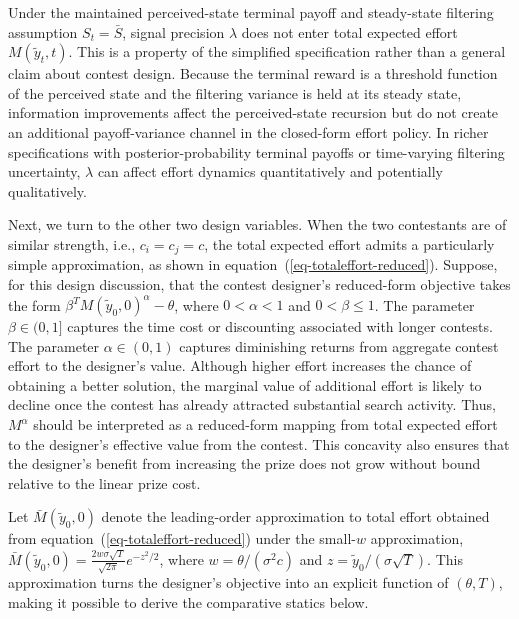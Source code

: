 \documentclass[mnsc]{informs3}
\begin{document}
Under the maintained perceived-state terminal payoff and steady-state filtering assumption $S_t=\bar S$, signal precision $\lambda$ does not enter total expected effort $M(\tilde{y}_t,t)$.
This is a property of the simplified specification rather than a general claim about contest design.
Because the terminal reward is a threshold function of the perceived state and the filtering variance is held at its steady state, information improvements affect the perceived-state recursion but do not create an additional payoff-variance channel in the closed-form effort policy.
In richer specifications with posterior-probability terminal payoffs or time-varying filtering uncertainty, $\lambda$ can affect effort dynamics quantitatively and potentially qualitatively.

Next, we turn to the other two design variables.
When the two contestants are of similar strength, i.e., $c_i = c_j = c$, the total expected effort admits a particularly simple approximation, as shown in equation~(\ref{eq-totaleffort-reduced}).
Suppose, for this design discussion, that the contest designer's reduced-form objective takes the form $\beta^{T}M(\tilde{y}_0,0)^\alpha-\theta$, where $0<\alpha<1$ and $0<\beta\leq 1$.
The parameter $\beta\in(0,1]$ captures the time cost or discounting associated
with longer contests.
The parameter $\alpha\in(0,1)$ captures diminishing returns from aggregate
contest effort to the designer's value.
Although higher effort increases the chance of obtaining a better solution, the marginal value of additional effort is likely to decline once the contest has already attracted substantial search
activity.
Thus, $M^\alpha$ should be interpreted as a reduced-form mapping from total expected effort to the designer's effective value from the contest.
This concavity also ensures that the designer's benefit from increasing the prize does not grow without bound relative to the linear prize cost.


Let $\bar{M}(\tilde y_0,0)$ denote the leading-order approximation to total effort obtained from equation~(\ref{eq-totaleffort-reduced}) under the small-$w$ approximation, $\bar{M}(\tilde y_0,0) = \frac{2w\sigma\sqrt{T}}{\sqrt{2\pi}}e^{-z^2/2}$, where $w=\theta/(\sigma^2c)$ and $z=\tilde y_0/(\sigma\sqrt{T})$.
This approximation turns the designer's objective into an explicit function of $(\theta,T)$, making it possible to derive the comparative statics below.
\end{document}
